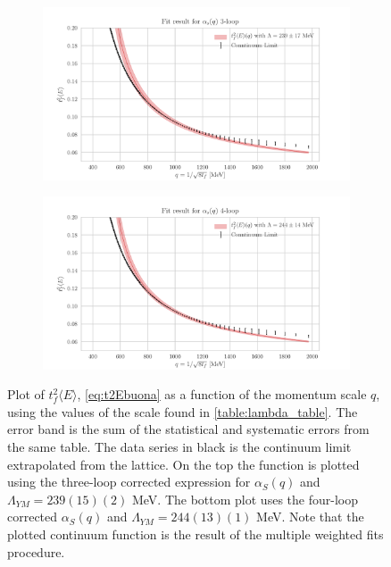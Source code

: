 \begin{figure}[hbt!]
    \centering
    \begin{subfigure}{0.7\textwidth}
        \centering
        \includegraphics[width=1\textwidth]{results/End3.pdf}
    \end{subfigure}
    \begin{subfigure}{0.7\textwidth}
        \centering
        \includegraphics[width=1\textwidth]{results/End4.pdf}        
    \end{subfigure}
        \caption{Plot of $t_f^2\langle E\rangle$, \cref{eq:t2Ebuona} as a function of the momentum scale $q$, using the values of the scale found in \cref{table:lambda_table}. The error band is the sum of the statistical and systematic errors from the same table. The data series in black is the continuum limit extrapolated from the lattice. On the top the function is plotted using the three-loop corrected expression for $\alpha_S(q)$ and $\Lambda_{YM} =239(15)(2)$ MeV. The bottom plot uses the four-loop corrected  $\alpha_S(q)$ and $\Lambda_{YM} =244(13)(1)$ MeV. Note that the plotted continuum function is the result of the multiple weighted fits procedure.}
    \label{fig:end1}
\end{figure}

